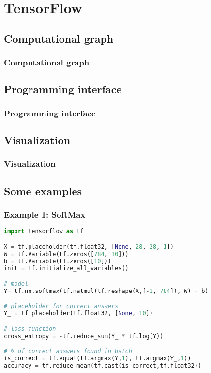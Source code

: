 
\section{TensorFlow}\label{sec:TF}

\subsection{Computational graph}

\begin{frame}
  \MyLogo
  \frametitle{Computational graph}  

\end{frame}

\subsection{Programming interface}

\begin{frame}
  \MyLogo
  \frametitle{Programming interface}  

\end{frame}

\subsection{Visualization}

\begin{frame}
  \MyLogo
  \frametitle{Visualization}  

\end{frame}

\subsection{Some examples}

\begin{frame}[fragile]
  \MyLogo
  \frametitle{Example 1: SoftMax}  
 
\scriptsize{
\begin{lstlisting}[language=python]
import tensorflow as tf    

X = tf.placeholder(tf.float32, [None, 28, 28, 1])     
W = tf.Variable(tf.zeros([784, 10]))    
b = tf.Variable(tf.zeros([10]))   
init = tf.initialize_all_variables() 

# model
Y= tf.nn.softmax(tf.matmul(tf.reshape(X,[-1, 784]), W) + b)  

# placeholder for correct answers    
Y_ = tf.placeholder(tf.float32, [None, 10])  

# loss function   
cross_entropy = -tf.reduce_sum(Y_ * tf.log(Y))  

# % of correct answers found in batch
is_correct = tf.equal(tf.argmax(Y,1), tf.argmax(Y_,1))  
accuracy = tf.reduce_mean(tf.cast(is_correct,tf.float32))  
\end{lstlisting}
}
\end{frame}

